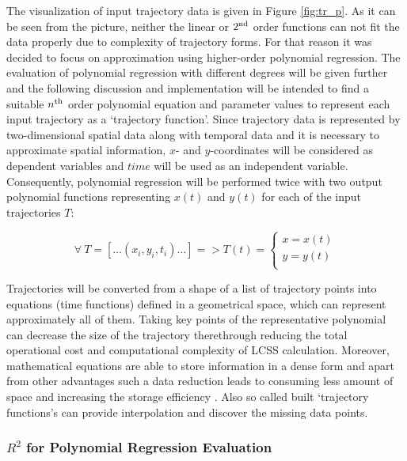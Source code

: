 The visualization of input trajectory data is given in Figure \ref{fig:tr_p}. As it can be seen from the picture, neither the linear or $2\textsuperscript{nd}$ order functions can not fit the data properly due to complexity of trajectory forms. For that reason it was decided to focus on approximation using higher-order polynomial regression. The evaluation of polynomial regression with different degrees will be given further and the following discussion and implementation will be intended to find a suitable $n\textsuperscript{th}$ order polynomial equation and parameter values to represent each input trajectory as a `trajectory function'. Since trajectory data is represented by two-dimensional spatial data along with temporal data and it is necessary to approximate spatial information, $x$- and $y$-coordinates will be considered as dependent variables and $time$ will be used as an independent variable. Consequently, polynomial regression will be performed twice with two output polynomial functions representing $x(t)$ and $y(t)$ for each of the input trajectories $T$:

\begin{equation}\label{eq:regr-func}
\forall\ T = [\ldots (x_i, y_i, t_i) \ldots] = > T(t) = 
\begin{cases}
x = x(t) \\
y = y(t) \\
\end{cases}
\end{equation}

Trajectories will be converted from a shape of a list of trajectory points into equations (time functions) defined in a geometrical space, which can represent approximately all of them. Taking key points of the representative polynomial can decrease the size of the trajectory therethrough reducing the total operational cost and computational complexity of LCSS calculation. Moreover, mathematical equations are able to store information in a dense form and apart from other advantages such a data reduction leads to consuming less amount of space and increasing the storage efficiency \cite{article:behav_form_extr}. Also so called built `trajectory functions's can provide interpolation and discover the missing data points.

\bigbreak

\subsubsection{$R^2$ for Polynomial Regression Evaluation}


